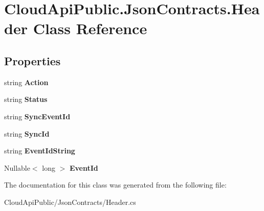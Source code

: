 \hypertarget{class_cloud_api_public_1_1_json_contracts_1_1_header}{\section{Cloud\-Api\-Public.\-Json\-Contracts.\-Header Class Reference}
\label{class_cloud_api_public_1_1_json_contracts_1_1_header}
}
\subsection*{Properties}
\begin{DoxyCompactItemize}
\item 
\hypertarget{class_cloud_api_public_1_1_json_contracts_1_1_header_ae3ca6da70deb439b38f05d88dba325e5}{string {\bfseries Action}}\label{class_cloud_api_public_1_1_json_contracts_1_1_header_ae3ca6da70deb439b38f05d88dba325e5}

\item 
\hypertarget{class_cloud_api_public_1_1_json_contracts_1_1_header_a7ef9b2b485b49e674d3ecdea9b899799}{string {\bfseries Status}}\label{class_cloud_api_public_1_1_json_contracts_1_1_header_a7ef9b2b485b49e674d3ecdea9b899799}

\item 
\hypertarget{class_cloud_api_public_1_1_json_contracts_1_1_header_a6a41403b988719d57403e4f75e5bd3c0}{string {\bfseries Sync\-Event\-Id}}\label{class_cloud_api_public_1_1_json_contracts_1_1_header_a6a41403b988719d57403e4f75e5bd3c0}

\item 
\hypertarget{class_cloud_api_public_1_1_json_contracts_1_1_header_aacc52e41ab0b3a580950b87bfac9c2e5}{string {\bfseries Sync\-Id}}\label{class_cloud_api_public_1_1_json_contracts_1_1_header_aacc52e41ab0b3a580950b87bfac9c2e5}

\item 
\hypertarget{class_cloud_api_public_1_1_json_contracts_1_1_header_a73b429247eb6c2dec44acfab5e12905b}{string {\bfseries Event\-Id\-String}}\label{class_cloud_api_public_1_1_json_contracts_1_1_header_a73b429247eb6c2dec44acfab5e12905b}

\item 
\hypertarget{class_cloud_api_public_1_1_json_contracts_1_1_header_a23783e6302ba32e4d015826533049974}{Nullable$<$ long $>$ {\bfseries Event\-Id}}\label{class_cloud_api_public_1_1_json_contracts_1_1_header_a23783e6302ba32e4d015826533049974}

\end{DoxyCompactItemize}


The documentation for this class was generated from the following file\-:\begin{DoxyCompactItemize}
\item 
Cloud\-Api\-Public/\-Json\-Contracts/Header.\-cs\end{DoxyCompactItemize}

